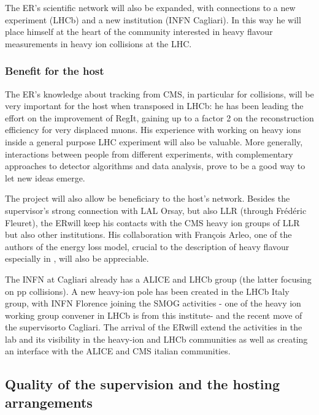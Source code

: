 \documentclass[a4paper,11pt]{article}
\newcommand{\ER}{ER}
\newcommand{\supervisor}{the supervisor}
\begin{document}
The \ER's scientific network will also be expanded, with connections to a new experiment (LHCb) and a new institution (INFN Cagliari). In this way he will place himself at the heart of the community interested in heavy flavour measurements in heavy ion collisions at the LHC.



\subsubsection{Benefit for the host}

The \ER's knowledge about tracking from CMS, in particular for \pbpb collisions, will be very important for the host when transposed in LHCb: he has been leading the effort on the improvement of RegIt, gaining up to a factor 2 on the reconstruction efficiency for very displaced muons. His experience with working on heavy ions inside a general purpose LHC experiment will also be valuable. More generally, interactions between people from different experiments, with complementary approaches to detector algorithms and data analysis, prove to be a good way to let new ideas emerge. 

The project will also allow be beneficiary to the host's network. Besides \supervisor's strong connection with LAL Orsay, but also LLR (through Frédéric Fleuret), the \ER will keep his contacts with the CMS heavy ion groups of LLR but also other institutions. His collaboration with François Arleo, one of the authors of the energy loss model, crucial to the description of heavy flavour especially in \ppb, will also be appreciable.

The INFN at Cagliari already has a ALICE and LHCb group (the latter
focusing on pp collisions). A new heavy-ion pole has been created in the
LHCb Italy group, with INFN Florence joining the SMOG activities - one 
of the heavy ion working group convener in LHCb is from this institute-
and the recent move of \supervisor to Cagliari. The arrival of the 
\ER will extend the activities in the lab and its visibility in
the heavy-ion and LHCb communities as well as creating an
interface with the ALICE and CMS italian communities.



%           

\subsection{Quality of the supervision and the hosting arrangements} 
\label{sec:supervision}
\end{document}

